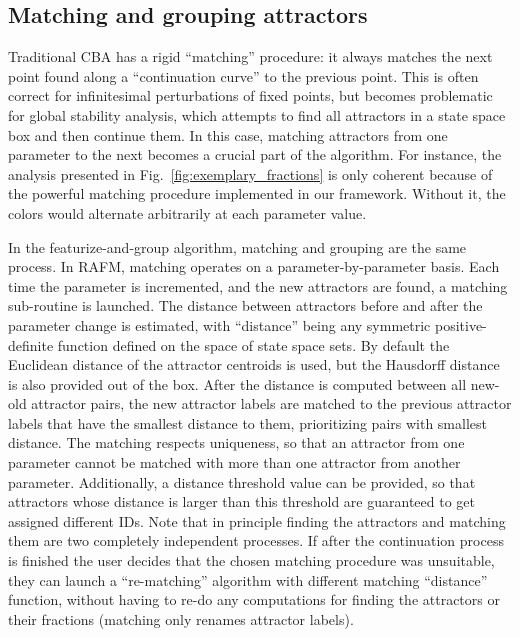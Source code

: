 \documentclass[9pt,twocolumn,twoside,lineno]{pnas-new}
\begin{document}
\subsection{Matching and grouping attractors}
\label{sec:matching}
Traditional CBA has a rigid ``matching'' procedure: it always matches the next point found along a ``continuation curve'' to the previous point. This is often correct for infinitesimal perturbations of fixed points, but becomes problematic for global stability analysis, which attempts to find all attractors in a state space box and then continue them. In this case, matching attractors from one parameter to the next becomes a crucial part of the algorithm. For instance, the analysis presented in Fig.~\ref{fig:exemplary_fractions} is only coherent because of the powerful matching procedure implemented in our framework. Without it, the colors would alternate arbitrarily at each parameter value.

In the featurize-and-group algorithm, matching and grouping are the same process. In RAFM, matching operates on a parameter-by-parameter basis. Each time the parameter is incremented, and the new attractors are found, a matching sub-routine is launched. The distance between attractors before and after the parameter change is estimated, with ``distance'' being any symmetric positive-definite function defined on the space of state space sets. By default the Euclidean distance of the attractor centroids is used, but the Hausdorff distance~\cite{Hausdorff1949-nn} is also provided out of the box. After the distance is computed between all new-old attractor pairs, the new attractor labels are matched to the previous attractor labels that have the smallest distance to them, prioritizing pairs with smallest distance. The matching respects uniqueness, so that an attractor from one parameter cannot be matched with more than one attractor from another parameter. Additionally, a distance threshold value can be provided, so that attractors whose distance is larger than this threshold are guaranteed to get assigned different IDs. Note that in principle finding the attractors and matching them are two completely independent processes. If after the continuation process is finished the user decides that the chosen matching procedure was unsuitable, they can launch a ``re-matching'' algorithm with different matching ``distance'' function, without having to re-do any computations for finding the attractors or their fractions (matching only renames attractor labels).
\end{document}
